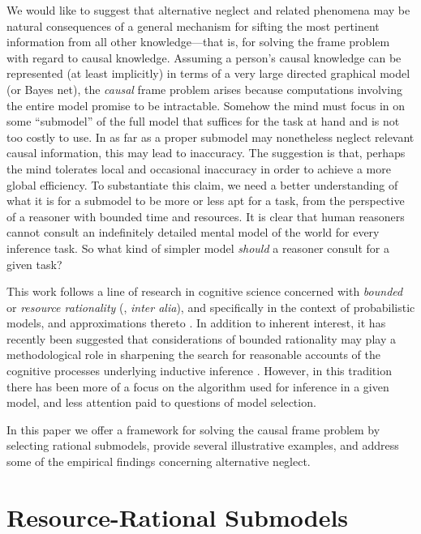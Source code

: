\documentclass[10pt,letterpaper]{article}
\begin{document}
We would like to suggest that alternative neglect and related phenomena may be natural consequences of a general mechanism for sifting the most pertinent information from all other knowledge---that is, for solving the frame problem with regard to causal knowledge. Assuming a person's causal knowledge can be represented (at least implicitly) in terms of a very large directed graphical model (or Bayes net), the \emph{causal} frame problem arises because computations involving the entire model promise to be intractable. Somehow the mind must focus in on some ``submodel'' of the full model that suffices for the task at hand and is not too costly to use. In as far as a proper submodel may nonetheless neglect relevant causal information, this may lead to inaccuracy. The suggestion is that, perhaps the mind tolerates local and occasional inaccuracy in order to achieve a more global efficiency. 
To substantiate this claim, we need a better understanding of what it is for a submodel to be more or less apt for a task, from the perspective of a reasoner with bounded time and resources. It is clear that human reasoners cannot consult an indefinitely detailed mental model of the world for every inference task. So what kind of simpler model \emph{should} a reasoner consult for a given task?

This work follows a line of research in cognitive science concerned with \emph{bounded} or \emph{resource rationality} (\citealt{Simon1957,Gigerenzer1996}, \emph{inter alia}), and specifically in the context of probabilistic models, and approximations thereto \citep{Vul2014}. In addition to inherent interest, it has recently been suggested that considerations of bounded rationality may play a methodological role in sharpening the search for reasonable accounts of the cognitive processes underlying inductive inference \citep{Griffiths2014,Icard2014}. However, in this tradition there has been more of a focus on the algorithm used for inference in a given model, and less attention paid to questions of model selection.

In this paper we offer a framework for solving the causal frame problem by selecting rational submodels, provide several illustrative examples, and address some of the empirical findings concerning alternative neglect.

\section{Resource-Rational Submodels}
\end{document}
